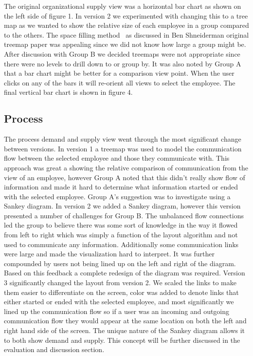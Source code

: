 \documentclass[journal]{vgtc}                %
\begin{document}
The original organizational supply view was a horizontal bar chart as shown on the left side of figure 1.  In version 2 we experimented with changing this to a tree map as we wanted to show the relative size of each employee in a group compared to the others.  The space filling method~\cite{shneiderman1992tree} as discussed in Ben Shneiderman original treemap paper was appealing since we did not know how large a group might be.  After discussion with Group B we decided treemaps were not appropriate since there were no levels to drill down to or group by.  It was also noted by Group A that a bar chart might be better for a comparison view point.  When the user clicks on any of the bars it will re-orient all views to select the employee.  The final vertical bar chart is shown in figure 4.



\subsection{Process}

The process demand and supply view went through the most significant change between versions.  In version 1 a treemap was used to model the communication flow between the selected employee and those they communicate with.  This approach was great a showing the relative comparison of communication from the view of an employee, however Group A noted that this didn't really show flow of information and made it hard to determine what information started or ended with the selected employee.  Group A's suggestion was to investigate using a Sankey diagram.
In version 2 we added a Sankey diagram, however this version presented a number of challenges for Group B.  The unbalanced flow connections led the group to believe there was some sort of knowledge in the way it flowed from left to right which was simply a function of the layout algorithm and not used to communicate any information.  Additionally some communication links were large and made the visualization hard to interpret.  It was further compounded by users not being lined up on the left and right of the diagram.  Based on this feedback a complete redesign of the diagram was required.
Version 3 significantly changed the layout from version 2.  We scaled the links to make them easier to differentiate on the screen, color was added to denote links that either started or ended with the selected employee, and most significantly we lined up the communication flow so if a user was an incoming and outgoing communication flow they would appear at the same location on both the left and right hand side of the screen.
The unique nature of the Sankey diagram allows it to both show demand and supply.  This concept will be further discussed in the evaluation and discussion section.
\end{document}
